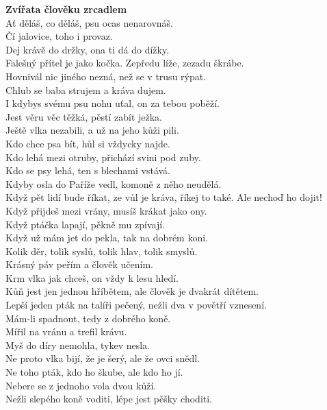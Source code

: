 \begin{multicols}{2}
\noindent
{\large\bf Zvířata člověku zrcadlem}\\[1 mm]
Ať děláš, co děláš, psu ocas nenarovnáš.\\
Čí jalovice, toho i provaz.\\
Dej krávě do držky, ona ti dá do dížky.\\
Falešný přítel je jako kočka. Zepředu líže, zezadu škrábe.\\
Hovnivál nic jiného nezná, než se v trusu rýpat.\\
Chlub se baba strujem a kráva dujem.\\
I kdybys svému psu nohu uťal, on za tebou poběží.\\
Jest věru věc těžká, pěstí zabít ježka.\\
Ještě vlka nezabili, a už na jeho kůži pili.\\
Kdo chce psa bít, hůl si vždycky najde.\\
Kdo lehá mezi otruby, přichází svini pod zuby.\\
Kdo se psy lehá, ten s blechami vstává.\\
Kdyby osla do Paříže vedl, komoně z něho neudělá.\\
Když pět lidí bude říkat, ze vůl je kráva, říkej to také. Ale
nechoď ho dojit!\\
Když přijdeš mezi vrány, musíš krákat jako ony.\\
Když ptáčka lapají, pěkně mu zpívají.\\
Když už mám jet do pekla, tak na dobrém koni.\\
Kolik děr, tolik syslů, tolik hlav, tolik smyslů.\\
Krásný páv peřím a člověk učením.\\
Krm vlka jak chceš, on vždy k lesu hledí.\\
Kůň jest jen jednou hříbětem, ale člověk je dvakrát dítětem.\\
Lepší jeden pták na talíři pečený, nežli dva v povětří vznesení.\\
Mám-li spadnout, tedy z dobrého koně.\\
Mířil na vránu a trefil krávu.\\
Myš do díry nemohla, tykev nesla.\\
Ne proto vlka bijí, že je šerý, ale že ovci snědl.\\
Ne toho pták, kdo ho škube, ale kdo ho jí.\\
Nebere se z jednoho vola dvou kůží.\\
Nežli slepého koně voditi, lépe jest pěšky choditi.\\

\end{multicols}
